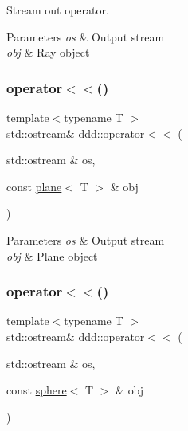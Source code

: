 Stream out operator. 


\begin{DoxyParams}{Parameters}
{\em os} & Output stream \\
\hline
{\em obj} & Ray object \\
\hline
\end{DoxyParams}
\mbox{\label{namespaceddd_af1faa02295670c7cfd7f0278e3973f84}} 
\subsubsection{\texorpdfstring{operator$<$$<$()}{operator<<()}\hspace{0.1cm}{\footnotesize\ttfamily [9/10]}}
{\footnotesize\ttfamily template$<$typename T $>$ \\
std\+::ostream\& ddd\+::operator$<$$<$ (\begin{DoxyParamCaption}\item[{std\+::ostream \&}]{os,  }\item[{const \hyperlink{classddd_1_1plane}{plane}$<$ T $>$ \&}]{obj }\end{DoxyParamCaption})\hspace{0.3cm}{\ttfamily [inline]}}


\begin{DoxyParams}{Parameters}
{\em os} & Output stream \\
\hline
{\em obj} & Plane object \\
\hline
\end{DoxyParams}
\mbox{\label{namespaceddd_a64dbb41c0ee377eb528907f3448514f6}} 
\subsubsection{\texorpdfstring{operator$<$$<$()}{operator<<()}\hspace{0.1cm}{\footnotesize\ttfamily [10/10]}}
{\footnotesize\ttfamily template$<$typename T $>$ \\
std\+::ostream\& ddd\+::operator$<$$<$ (\begin{DoxyParamCaption}\item[{std\+::ostream \&}]{os,  }\item[{const \hyperlink{classddd_1_1sphere}{sphere}$<$ T $>$ \&}]{obj }\end{DoxyParamCaption})\hspace{0.3cm}{\ttfamily [inline]}}



